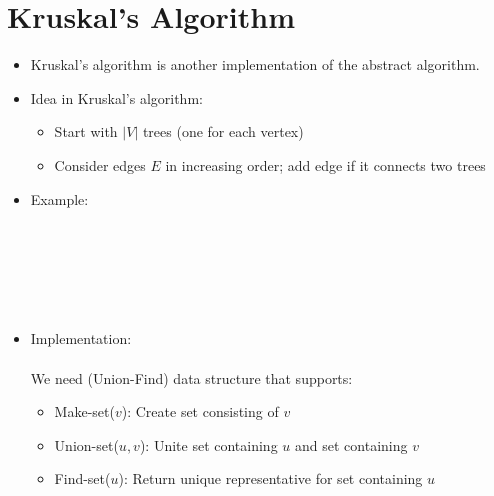 \documentclass[11pt]{article}
\begin{document}
\section{Kruskal's Algorithm}
\begin{itemize}
\item Kruskal's algorithm is another implementation of the abstract algorithm.
\item Idea in Kruskal's algorithm:
  \begin{itemize}
  \item Start with $|V|$ trees (one for each vertex)
  \item Consider edges $E$ in increasing order; add edge if it
    connects two trees
  \end{itemize}
  


\item Example: \\ \\
  \centerline{} \\ \\
  \centerline{} \\

\item Implementation: \\ \\
  We need (Union-Find) data structure that supports:
  \begin{itemize}
  \item {\sc Make-set}($v$): Create set consisting of $v$
  \item {\sc Union-set}($u,v$): Unite set containing $u$ and set
    containing $v$
  \item {\sc Find-set}($u$): Return unique representative for
    set containing $u$
  \end{itemize}
  


\end{itemize}
\end{document}
